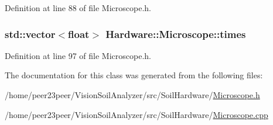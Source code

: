 Definition at line 88 of file Microscope.\+h.

\hypertarget{class_hardware_1_1_microscope_a5aababdeaa4cc4da051c0e44cba20003}{}
\subsubsection[{times}]{\setlength{\rightskip}{0pt plus 5cm}std\+::vector$<$float$>$ Hardware\+::\+Microscope\+::times\hspace{0.3cm}{\ttfamily [private]}}\label{class_hardware_1_1_microscope_a5aababdeaa4cc4da051c0e44cba20003}


Definition at line 97 of file Microscope.\+h.



The documentation for this class was generated from the following files\+:\begin{DoxyCompactItemize}
\item 
/home/peer23peer/\+Vision\+Soil\+Analyzer/src/\+Soil\+Hardware/\hyperlink{_microscope_8h}{Microscope.\+h}\item 
/home/peer23peer/\+Vision\+Soil\+Analyzer/src/\+Soil\+Hardware/\hyperlink{_microscope_8cpp}{Microscope.\+cpp}\end{DoxyCompactItemize}
